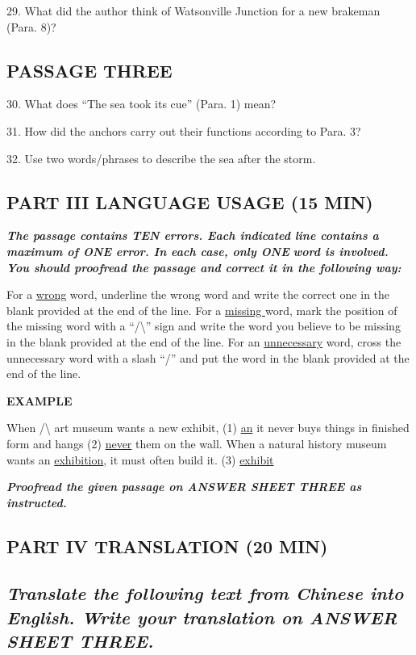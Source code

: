 \documentclass[UTF8,11pt]{ctexart}
\begin{document}
29. What did the author think of Watsonville Junction for a new brakeman (Para. 8)?


\subsection*{\textbf{PASSAGE THREE}}


30. What does “The sea took its cue” (Para. 1) mean?


31. How did the anchors carry out their functions according to Para. 3?


32. Use two words/phrases to describe the sea after the storm.


\subsection*{\textbf{PART III LANGUAGE USAGE (15 MIN)}}


\textbf{\textit{The passage contains TEN errors. Each indicated line contains a maximum of ONE error. In each case, only ONE}} \textbf{\textit{word is involved. You should proofread the passage and correct it in the following way:}}


For a \uline{wrong} word, underline the wrong word and write the correct one in the blank provided at the end of the line. For a \uline{missing }word, mark the position of the missing word with a “/\textbackslash{}” sign and write the word you believe to be missing in the blank provided at the end of the line. For an \uline{unnecessary} word, cross the unnecessary word with a slash “/” and put the word in the blank provided at the end of the line.


\textbf{EXAMPLE}


When /\textbackslash{} art museum wants a new exhibit, (1) \uline{an} it never buys things in finished form and hangs (2) \uline{never} them on the wall. When a natural history museum wants an \uline{exhibition}, it must often build it. (3) \uline{exhibit}


\textbf{\textit{Proofread the given passage on ANSWER SHEET THREE as instructed.}}


\subsection*{\textbf{PART IV TRANSLATION (20 MIN)}}


\subsection*{\textbf{\textit{Translate the following text from Chinese into English. Write your translation on ANSWER SHEET THREE.}}}
\end{document}
